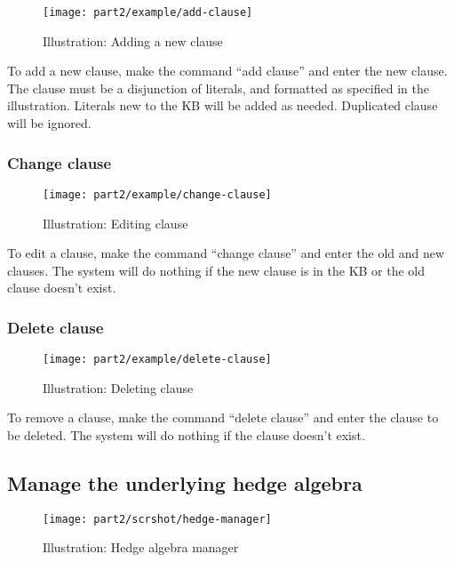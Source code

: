 \documentclass[../gr-final.tex]{subfiles}
\begin{document}
\begin{figure}[H]
  \centering
  \texttt{[image: part2/example/add-clause]}
  \caption{Illustration: Adding a new clause}
\end{figure}
To add a new clause, make the command ``add clause''
and enter the new clause. The clause must be a disjunction of
literals, and formatted as specified in the illustration.
Literals new to the KB will be added as needed.
Duplicated clause will be ignored.

\subsubsection{Change clause} 

\begin{figure}[H]
  \centering
  \texttt{[image: part2/example/change-clause]}
  \caption{Illustration: Editing clause}
\end{figure}
To edit a clause, make the command ``change clause''
and enter the old and new clauses.
The system will do nothing if the new clause is in the KB or the
old clause doesn't exist.

\subsubsection{Delete clause} 

\begin{figure}[H]
  \centering
  \texttt{[image: part2/example/delete-clause]}
  \caption{Illustration: Deleting clause}
\end{figure}
To remove a clause, make the command ``delete clause''
and enter the clause to be deleted.
The system will do nothing if the clause doesn't exist.

\subsection{Manage the underlying hedge algebra}

\begin{figure}[H]
  \centering
  \texttt{[image: part2/scrshot/hedge-manager]}
  \caption{Illustration: Hedge algebra manager}
\end{figure}
\end{document}
